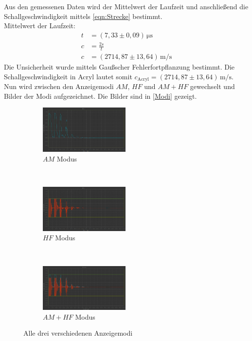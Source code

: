   Aus den gemessenen Daten wird der Mittelwert der Laufzeit und anschließend die Schallgeschwindigkeit mittels \autoref{eqn:Strecke} bestimmt.\\
  Mittelwert der Laufzeit:
  \begin{align*}
    t &= (7,33 \pm 0,09) \, \si{\micro\second} \\
    c &= \frac{2s}{t} \\
    c &= (2714,87 \pm 13,64) \, \si{\meter\per\second}
  \end{align*}
  Die Unsicherheit wurde mittels Gaußscher Fehlerfortpflanzung bestimmt. Die Schallgeschwindigkeit in Acryl lautet somit
  $c_{\mathrm{Acryl}} = (2714,87 \pm 13,64) \, \si{\meter\per\second}$.\\
  Nun wird zwischen den Anzeigemodi $AM$, $HF$ und $AM + HF$ gewechselt und Bilder der Modi aufgezeichnet. Die Bilder sind 
  in \autoref{Modi} gezeigt.
  \begin{figure}
    \centering
    \begin{subfigure}[b]{0.3\textwidth}
      \centering
      \includegraphics[width=4.5cm]{messwerte/Vorbereitung/Amp.png}
      \caption{$AM$ Modus}
    \end{subfigure}
    ~
    \begin{subfigure}[b]{0.3\textwidth}
      \centering
      \includegraphics[width=4.5cm]{messwerte/Vorbereitung/HF.png}
      \caption{$HF$ Modus}
    \end{subfigure}
    ~
    \begin{subfigure}[b]{0.3\textwidth}
      \centering
      \includegraphics[width=4.5cm]{messwerte/Vorbereitung/HF+Amp.png}
      \caption{$AM + HF$ Modus}
    \end{subfigure}
    \caption{Alle drei verschiedenen Anzeigemodi}
    \label{Modi}
  \end{figure}

